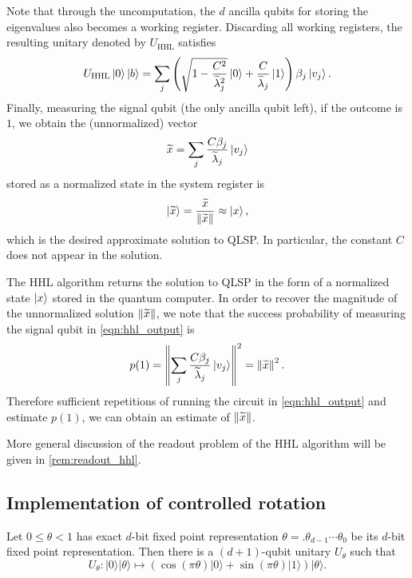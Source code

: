 Note that through the uncomputation, the $d$ ancilla qubits for storing the eigenvalues also becomes a working register.
Discarding all working registers, the resulting unitary denoted by $U_{\mathrm{HHL}}$ satisfies
\begin{equation}
U_{\mathrm{HHL}}\ket{0}\ket{b}=\sum_{j}\left(\sqrt{1-\frac{C^{2}}{\widetilde{\lambda}_{j}^{2}}}\ket{0}+\frac{C}{\widetilde{\lambda}_{j}}\ket{1}\right)
\beta_j\ket{v_j}.
\label{eqn:hhl_output}
\end{equation}
Finally, measuring the signal qubit (the only ancilla qubit left), if the outcome is $1$, we obtain the (unnormalized) vector
\begin{equation}
\widetilde{x}=\sum_{j}\frac{C\beta_j}{\widetilde{\lambda}_{j}}\ket{v_j}
\end{equation}
stored as a normalized state in the system register is
\begin{equation}
\ket{\widetilde{x}}=\frac{\widetilde{x}}{\left\lVert\widetilde{x}\right\rVert}\approx \ket{x},
\end{equation}
which is the desired approximate solution to QLSP.
In particular, the constant $C$ does not appear in the solution.

\begin{rem}
The HHL algorithm returns the solution to QLSP in the form of a normalized state $\ket{x}$ stored in the quantum computer. In order to recover the magnitude of the unnormalized solution $\left\lVert\widetilde{x}\right\rVert$, we note that the success probability of measuring the signal qubit in \cref{eqn:hhl_output} is
\begin{equation}
p(1)=\left\lVert\sum_{j}\frac{C\beta_j}{\widetilde{\lambda}_{j}}\ket{v_j}\right\rVert^2=\left\lVert\widetilde{x}\right\rVert^2.
\end{equation} 
Therefore sufficient repetitions of running the circuit in \cref{eqn:hhl_output} and estimate $p(1)$, we can obtain an estimate of $\left\lVert\widetilde{x}\right\rVert$. 
\end{rem}
More general discussion of the readout problem of the HHL algorithm will be given in \cref{rem:readout_hhl}.

\subsection{Implementation of controlled rotation}\label{sec:controlled_rotation}


\begin{prop}\label{prop:controlled_rotation}
Let \(0\le\theta<1\) has exact $d$-bit fixed point representation \(\theta=.\theta_{d-1}\cdots\theta_0\) be its \(d\)-bit fixed point representation. Then there is a $(d+1)$-qubit unitary \(U_{\theta}\) such that
\begin{equation}
U_{\theta}: |0\rangle|\theta\rangle \mapsto
(\cos (\pi\theta)|0\rangle+\sin (\pi\theta)|1\rangle)|\theta\rangle.
\end{equation}
\end{prop}

